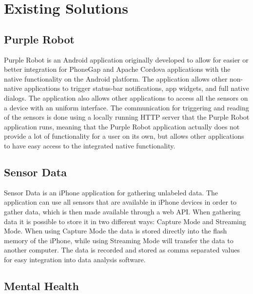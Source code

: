 
\section{Existing Solutions}
\label{sec:existing_solutions}


\subsection{Purple Robot}
\label{sub:purple_robot}

Purple Robot is an Android application originally developed to allow for easier or better integration for PhoneGap and Apache Cordova applications with the native functionality on the Android platform. The application allows other non-native applications to trigger status-bar notifications, app widgets, and full native dialogs. 
The application also allows other applications to access all the sensors on a device with an uniform interface. 
The communication for triggering and reading of the sensors is done using a locally running HTTP server that the Purple Robot application runs, meaning that the Purple Robot application actually does not provide a lot of functionality for a user on its own, but allows other applications to have easy access to the integrated native functionality.



\subsection{Sensor Data} 
\label{sub:sensor_data}

Sensor Data is an iPhone application for gathering unlabeled data. The application can use all sensors that are available in iPhone devices in order to gather data, which is then made available through a web API. When gathering data it is possible to store it in two different ways: Capture Mode and Streaming Mode. When using Capture Mode the data is stored directly into the flash memory of the iPhone, while using Streaming Mode will transfer the data to another computer. The data is recorded and stored as comma separated values for easy integration into data analysis software.


\subsection{Mental Health} %
\label{sub:mental_health}

